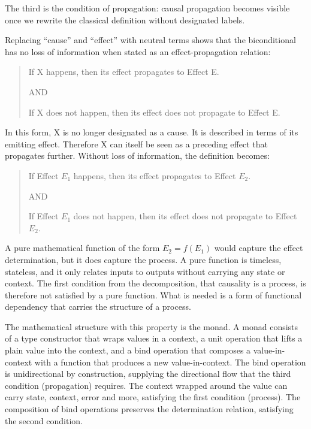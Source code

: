  The third is the condition of propagation: causal propagation becomes visible once we rewrite the classical definition without designated labels. 
 
 \newpage
 
 Replacing ``cause'' and ``effect'' with neutral terms shows that the biconditional has no loss of information when stated as an effect-propagation relation:
 
\begin{quote}
    If X happens, then its effect propagates to Effect E.
 
    AND
    
    If X does not happen, then its effect does not propagate to Effect E.
\end{quote}
 
In this form, X is no longer designated as a cause. It is described in terms of its emitting effect. Therefore X can itself be seen as a preceding effect that propagates further. Without loss of information, the definition becomes:
 
\begin{quote}
	If Effect $E_1$ happens, then its effect propagates to Effect $E_2$.
 
    AND
    
	If Effect $E_1$ does not happen, then its effect does not propagate to Effect $E_2$.
\end{quote}
 
 A pure mathematical function of the form $E_2 = f(E_1)$ would capture the effect determination, but it does capture the process. A pure function is timeless, stateless, and it only relates inputs to outputs without carrying any state or context. The first condition from the decomposition, that causality is a process, is therefore not satisfied by a pure function. What is needed is a form of functional dependency that carries the structure of a process. 
 
The mathematical structure with this property is the monad. A monad consists of a type constructor that wraps values in a context, a unit operation that lifts a plain value into the context, and a bind operation that composes a value-in-context with a function that produces a new value-in-context. The bind operation is unidirectional by construction, supplying the directional flow that the third condition (propagation) requires. The context wrapped around the value can carry state, context, error and more, satisfying the first condition (process). The composition of bind operations preserves the determination relation, satisfying the second condition.

